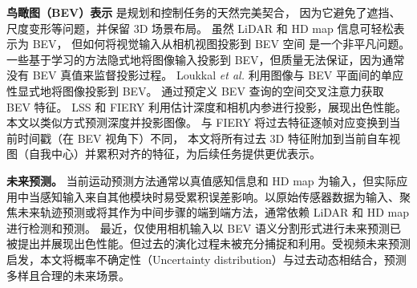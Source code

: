 \documentclass[runningheads]{llncs}
\begin{document}
%




%


\noindent\textbf{鸟瞰图（BEV）表示}
是规划和控制任务的天然完美契合\cite{ng2020bev,zhang2021end,9123682,chitta2021neat,bansal2018chauffeurnet}，
因为它避免了遮挡、尺度变形等问题，并保留 3D 场景布局。
%
虽然 LiDAR 和 HD map 信息可轻松表示为 BEV，
但如何将视觉输入从相机视图投影到 BEV 空间
是一个非平凡问题。
%
一些基于学习的方法\cite{chitta2021neat,9123682}隐式地将图像输入投影到 BEV，但质量无法保证，因为通常没有 BEV 真值来监督投影过程。
%
Loukkal \textit{et al.}
\cite{loukkal2021driving} 利用图像与 BEV 平面间的单应性显式地将图像投影到 BEV。
%
\cite{li2022bevformer,chen2022persformer} 通过预定义 BEV 查询的空间交叉注意力获取 BEV 特征。
LSS\cite{philion2020lift} 和 FIERY\cite{hu2021fiery} 利用估计深度和相机内参进行投影，展现出色性能。
%
本文以类似方式预测深度并投影图像。
与 FIERY\cite{hu2021fiery} 将过去特征逐帧对应变换到当前时间戳（在 BEV 视角下）不同，
本文将所有过去 3D 特征附加到当前自车视图（自我中心）并累积对齐的特征，为后续任务提供更优表示。

\noindent\textbf{未来预测。}
当前运动预测方法\cite{ngiam2021scene,gu2021densetnt,pmlr-v164-jia22a,LiaoICME22}通常以真值感知信息和 HD map 为输入，但实际应用中当感知输入来自其他模块时易受累积误差影响。以原始传感器数据为输入、聚焦未来轨迹预测或将其作为中间步骤的端到端方法，通常依赖 LiDAR 和 HD map\cite{luo2018fast,zeng2020dsdnet,zeng2019end,cui2021lookout,wei2021perceive}进行检测和预测。
最近，仅使用相机输入以 BEV 语义分割形式进行未来预测\cite{hu2021fiery,wang2021learning}已被提出并展现出色性能。但过去的演化过程未被充分捕捉和利用\cite{hu2021fiery,philion2020lift,wang2021learning}。受视频未来预测\cite{Hu2020ProbabilisticFP}启发，本文将概率不确定性（Uncertainty distribution）与过去动态相结合，预测多样且合理的未来场景。
\end{document}
